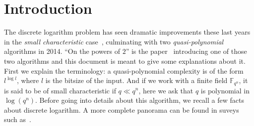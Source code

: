 \documentclass[a4paper,11pt]{article}
\title{}
\author{The powers-of-2 descent\\\textcolor{violet}{\textbf{Work in progress}}}
\theoremstyle{break}
\theoremstyle{sc}
\theoremstyle{definition}
\theoremstyle{remark}
\begin{document}
\maketitle





\section{Introduction}

The discrete logarithm problem has seen dramatic improvements these last
years in the \emph{small characteristic} case~\cite{Joux13, BGJT13, GKZ14},
culminating with two \emph{quasi-polynomial} algorithms in 2014. ``On the powers
of $2$'' is the paper~\cite{GKZ14} introducing one of those two algorithms and this document is
meant to give some explanations about it. First we explain the
terminology: a quasi-polynomial complexity is of the form $l^{\log l}$, where
$l$ is the bitsize of the input. And if we work with a finite field
$\mathbb{F}_{q^n}$, it is said to be of small characteristic if $q\ll q^n$, here
we ask that $q$ is polynomial in $\log(q^n)$. Before going into details about this
algorithm, we recall a few facts about discrete logarithm. A more complete
panorama can be found in suveys such as~\cite{JP16, GKZ16a}.
\end{document}
